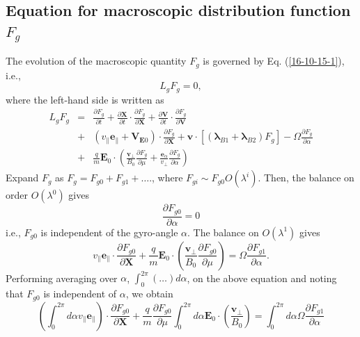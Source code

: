 \documentclass{article}
\newcommand{\tmmathbf}[1]{\ensuremath{\boldsymbol{#1}}}
\begin{document}
\subsection{Equation for macroscopic distribution function $F_g$}

The evolution of the macroscopic quantity $F_g$ is governed by Eq.
(\ref{16-10-15-1}), i.e.,
\begin{equation}
  L_g F_g = 0,
\end{equation}
where the left-hand side is written as
\begin{eqnarray*}
  L_g F_g & = & \frac{\partial F_g}{\partial t} + \frac{\partial
  \mathbf{X}}{\partial t} \cdot \frac{\partial F_g}{\partial \mathbf{X}} +
  \frac{\partial \mathbf{V}}{\partial t} \cdot \frac{\partial F_g}{\partial
  \mathbf{V}}\\
  & + & (v_{\parallel} \mathbf{e}_{\parallel} +\mathbf{V}_{\mathbf{E}0})
  \cdot \frac{\partial F_g}{\partial \mathbf{X}} +\mathbf{v} \cdot
  [(\tmmathbf{\lambda}_{B 1} +\tmmathbf{\lambda}_{B 2}) F_g] - \Omega
  \frac{\partial F_g}{\partial \alpha}\\
  & + & \frac{q}{m} \mathbf{E}_0 \cdot \left( \frac{\mathbf{v}_{\perp}}{B_0} 
  \frac{\partial F_g}{\partial \mu} + \frac{\tmmathbf{e}_{\alpha}}{v_{\perp}} 
  \frac{\partial F_g}{\partial \alpha} \right)
\end{eqnarray*}
Expand $F_g$ as $F_g = F_{g 0} + F_{g 1} + \ldots$., where $F_{g i} \sim F_{g
0} O (\lambda^i)$. Then, the balance on order $O (\lambda^0)$ gives
\begin{equation}
  \frac{\partial F_{g 0}}{\partial \alpha} = 0
\end{equation}
i.e., $F_{g 0}$ is independent of the gyro-angle $\alpha$. The balance on $O
(\lambda^1)$ gives
\begin{equation}
  v_{\parallel} \mathbf{e}_{\parallel} \cdot \frac{\partial F_{g 0}}{\partial
  \mathbf{X}} + \frac{q}{m} \mathbf{E}_0 \cdot \left(
  \frac{\mathbf{v}_{\perp}}{B_0}  \frac{\partial F_{g 0}}{\partial \mu}
  \right) = \Omega \frac{\partial F_{g 1}}{\partial \alpha} .
\end{equation}
Performing averaging over $\alpha$, $\int_0^{2 \pi} (\ldots) d \alpha$, on the
above equation and noting that $F_{g 0}$ is independent of $\alpha$, we obtain
\begin{equation}
  \label{17-5-15-4} \left( \int_0^{2 \pi} d \alpha v_{\parallel}
  \mathbf{e}_{\parallel} \right) \cdot \frac{\partial F_{g 0}}{\partial
  \mathbf{X}} + \frac{q}{m} \frac{\partial F_{g 0}}{\partial \mu} \int_0^{2
  \pi} d \alpha \mathbf{E}_0 \cdot \left( \frac{\mathbf{v}_{\perp}}{B_0} 
  \right) = \int_0^{2 \pi} d \alpha \Omega \frac{\partial F_{g 1}}{\partial
  \alpha}
\end{equation}
\end{document}
